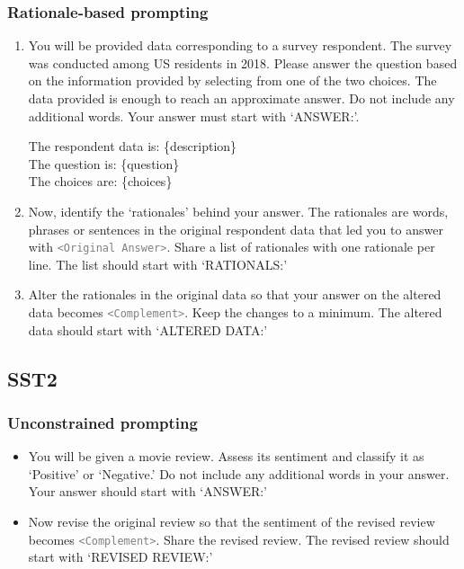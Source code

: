 \subsubsection{Rationale-based prompting}
\begin{enumerate}
    \item You will be provided data corresponding to a survey respondent. The survey was conducted among US residents in 2018. Please answer the question based on the information provided by selecting from one of the two choices. The data provided is enough to reach an approximate answer.
     Do not include any additional words. Your answer must start with `ANSWER:'.
    
    The respondent data is: \{description\}\\
    The question is: \{question\}\\
    The choices are: \{choices\}
     \item Now, identify the `rationales' behind your answer. The rationales are words, phrases or sentences in the original respondent data that led you to answer with \textcolor{gray}{\texttt{<Original Answer>}}. Share a list of rationales with one rationale per line. The list should start with `RATIONALS:'
    \item Alter the rationales in the original data so that your answer on the altered data becomes \textcolor{gray}{\texttt{<Complement>}}. Keep the changes to a minimum. The altered data should start with `ALTERED DATA:'
\end{enumerate}

\subsection{SST2}
\subsubsection{Unconstrained prompting}
\begin{itemize}
    \item You will be given a movie review. Assess its sentiment and classify it as `Positive' or `Negative.' Do not include any additional words in your answer. Your answer should start with `ANSWER:'
    \item Now revise the original review so that the sentiment of the revised review becomes \textcolor{gray}{\texttt{<Complement>}}. Share the revised review. The revised review should start with `REVISED REVIEW:'
\end{itemize}
